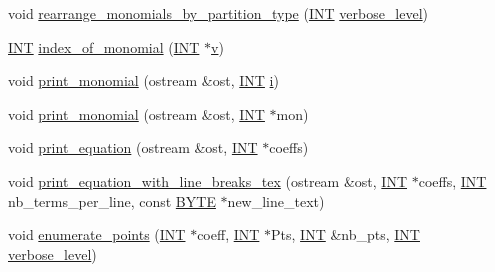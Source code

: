 \begin{DoxyCompactItemize}
\item 
void \mbox{\hyperlink{classhomogeneous__polynomial__domain_af774250d5c1bd555c0ea55f2aaafad10}{rearrange\+\_\+monomials\+\_\+by\+\_\+partition\+\_\+type}} (\mbox{\hyperlink{galois_8h_a09fddde158a3a20bd2dcadb609de11dc}{I\+NT}} \mbox{\hyperlink{simeon_8_c_a818073fbcc2f439e7c56952f67386122}{verbose\+\_\+level}})
\item 
\mbox{\hyperlink{galois_8h_a09fddde158a3a20bd2dcadb609de11dc}{I\+NT}} \mbox{\hyperlink{classhomogeneous__polynomial__domain_a3fad3fb2b940014fcfece1cebfbfa3ae}{index\+\_\+of\+\_\+monomial}} (\mbox{\hyperlink{galois_8h_a09fddde158a3a20bd2dcadb609de11dc}{I\+NT}} $\ast$\mbox{\hyperlink{classhomogeneous__polynomial__domain_ab0d1e093ed9589724a0a3e874ea92f51}{v}})
\item 
void \mbox{\hyperlink{classhomogeneous__polynomial__domain_aba45b13898b259a147e45bf92a622fd8}{print\+\_\+monomial}} (ostream \&ost, \mbox{\hyperlink{galois_8h_a09fddde158a3a20bd2dcadb609de11dc}{I\+NT}} \mbox{\hyperlink{alphabet2_8_c_acb559820d9ca11295b4500f179ef6392}{i}})
\item 
void \mbox{\hyperlink{classhomogeneous__polynomial__domain_a6a7befc3995c226fb303eafd572f25c4}{print\+\_\+monomial}} (ostream \&ost, \mbox{\hyperlink{galois_8h_a09fddde158a3a20bd2dcadb609de11dc}{I\+NT}} $\ast$mon)
\item 
void \mbox{\hyperlink{classhomogeneous__polynomial__domain_a39fe7da58a442801d7c8be1121a57bfe}{print\+\_\+equation}} (ostream \&ost, \mbox{\hyperlink{galois_8h_a09fddde158a3a20bd2dcadb609de11dc}{I\+NT}} $\ast$coeffs)
\item 
void \mbox{\hyperlink{classhomogeneous__polynomial__domain_a380597c635c722d4577cabce701bf55f}{print\+\_\+equation\+\_\+with\+\_\+line\+\_\+breaks\+\_\+tex}} (ostream \&ost, \mbox{\hyperlink{galois_8h_a09fddde158a3a20bd2dcadb609de11dc}{I\+NT}} $\ast$coeffs, \mbox{\hyperlink{galois_8h_a09fddde158a3a20bd2dcadb609de11dc}{I\+NT}} nb\+\_\+terms\+\_\+per\+\_\+line, const \mbox{\hyperlink{galois_8h_ab6cc7b4aeb6ea31aba2b3fbfc83ff5e6}{B\+Y\+TE}} $\ast$new\+\_\+line\+\_\+text)
\item 
void \mbox{\hyperlink{classhomogeneous__polynomial__domain_adc0868f632cc5662b7bfaf0b3d72268f}{enumerate\+\_\+points}} (\mbox{\hyperlink{galois_8h_a09fddde158a3a20bd2dcadb609de11dc}{I\+NT}} $\ast$coeff, \mbox{\hyperlink{galois_8h_a09fddde158a3a20bd2dcadb609de11dc}{I\+NT}} $\ast$Pts, \mbox{\hyperlink{galois_8h_a09fddde158a3a20bd2dcadb609de11dc}{I\+NT}} \&nb\+\_\+pts, \mbox{\hyperlink{galois_8h_a09fddde158a3a20bd2dcadb609de11dc}{I\+NT}} \mbox{\hyperlink{simeon_8_c_a818073fbcc2f439e7c56952f67386122}{verbose\+\_\+level}})

\end{DoxyCompactItemize}
